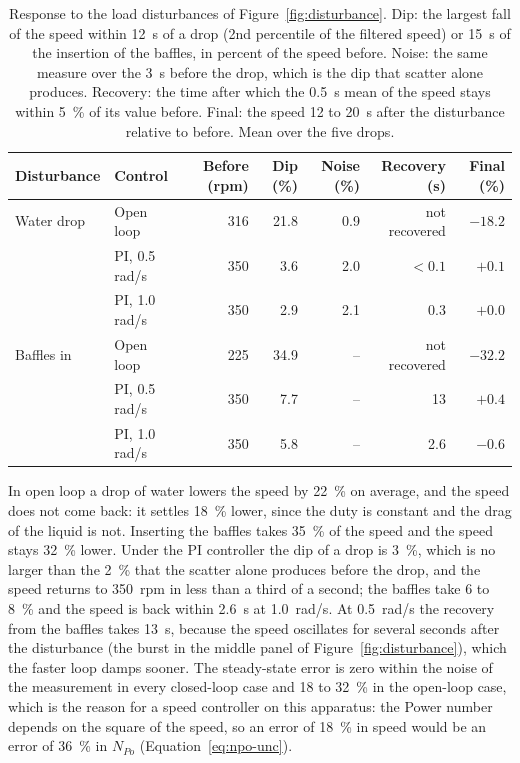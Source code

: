 \begin{table}[htbp]
    \centering
    \caption[Disturbance rejection, open loop against PI]{Response to the load disturbances of Figure~\ref{fig:disturbance}. Dip: the largest fall of the speed within 12~s of a drop (2nd percentile of the filtered speed) or 15~s of the insertion of the baffles, in percent of the speed before. Noise: the same measure over the 3~s before the drop, which is the dip that scatter alone produces. Recovery: the time after which the 0.5~s mean of the speed stays within 5~\% of its value before. Final: the speed 12 to 20~s after the disturbance relative to before. Mean over the five drops.}
    \label{tab:disturbance}
    \small
    \begin{tabular}{@{}llrrrrr@{}}
        \toprule
        Disturbance & Control & Before (rpm) & Dip (\%) & Noise (\%) & Recovery (s) & Final (\%) \\
        \midrule
        Water drop & Open loop & 316 & 21.8 & 0.9 & not recovered & $-18.2$ \\
        & PI, 0.5 rad/s & 350 & 3.6 & 2.0 & $<0.1$ & $+0.1$ \\
        & PI, 1.0 rad/s & 350 & 2.9 & 2.1 & 0.3 & $+0.0$ \\
        Baffles in & Open loop & 225 & 34.9 & -- & not recovered & $-32.2$ \\
        & PI, 0.5 rad/s & 350 & 7.7 & -- & 13 & $+0.4$ \\
        & PI, 1.0 rad/s & 350 & 5.8 & -- & 2.6 & $-0.6$ \\
        \bottomrule
    \end{tabular}
\end{table}

In open loop a drop of water lowers the speed by 22~\% on average, and the speed does not come back: it settles 18~\% lower, since the duty is constant and the drag of the liquid is not. Inserting the baffles takes 35~\% of the speed and the speed stays 32~\% lower. Under the PI controller the dip of a drop is 3~\%, which is no larger than the 2~\% that the scatter alone produces before the drop, and the speed returns to 350~rpm in less than a third of a second; the baffles take 6 to 8~\% and the speed is back within 2.6~s at 1.0~rad/s. At 0.5~rad/s the recovery from the baffles takes 13~s, because the speed oscillates for several seconds after the disturbance (the burst in the middle panel of Figure~\ref{fig:disturbance}), which the faster loop damps sooner. The steady-state error is zero within the noise of the measurement in every closed-loop case and 18 to 32~\% in the open-loop case, which is the reason for a speed controller on this apparatus: the Power number depends on the square of the speed, so an error of 18~\% in speed would be an error of 36~\% in $N_{Po}$ (Equation~\ref{eq:npo-unc}).

